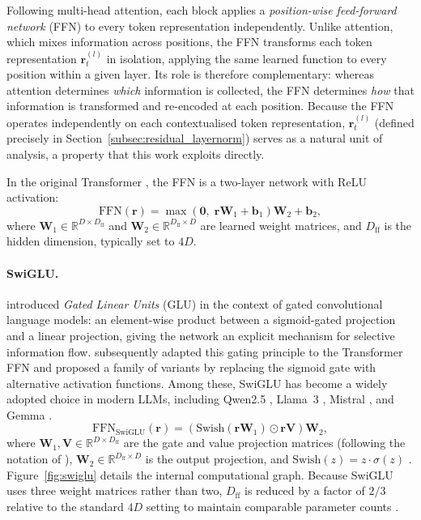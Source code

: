 Following multi-head attention, each block applies a \emph{position-wise
feed-forward network} (FFN) to every token representation independently. Unlike
attention, which mixes information across positions, the FFN transforms each token
representation $\mathbf{r}_t^{(l)}$ in isolation, applying the same learned function
to every position within a given layer. Its role is therefore complementary:
whereas attention determines \emph{which} information is collected, the FFN
determines \emph{how} that information is transformed and re-encoded at each
position. Because the FFN operates independently on each contextualised token
representation, $\mathbf{r}_t^{(l)}$ (defined precisely in
Section~\ref{subsec:residual_layernorm}) serves as a natural unit of analysis, a
property that this work exploits directly.

In the original Transformer \citep{vaswani2017attention}, the FFN is a two-layer
network with ReLU activation:
\begin{equation}
    \mathrm{FFN}(\mathbf{r})
    =
    \max\!\left(\mathbf{0},\; \mathbf{r}\mathbf{W}_1 + \mathbf{b}_1\right)
    \mathbf{W}_2 + \mathbf{b}_2,
    \label{eq:ffn_original}
\end{equation}
where $\mathbf{W}_1 \in \mathbb{R}^{D \times D_{\mathrm{ff}}}$ and
$\mathbf{W}_2 \in \mathbb{R}^{D_{\mathrm{ff}} \times D}$ are learned weight
matrices, and $D_{\mathrm{ff}}$ is the hidden dimension, typically set to $4D$.

\paragraph{SwiGLU.}
\citet{dauphin2017language} introduced \emph{Gated Linear Units} (GLU) in the
context of gated convolutional language models: an element-wise product between a
sigmoid-gated projection and a linear projection, giving the network an explicit
mechanism for selective information flow. \citet{shazeer2020glu} subsequently
adapted this gating principle to the Transformer FFN and proposed a family of
variants by replacing the sigmoid gate with alternative activation functions. Among these, SwiGLU has become a widely adopted choice in modern LLMs, including Qwen2.5 \citep{qwen2025qwen25}, Llama~3 \citep{grattafiori2024llama3}, Mistral \citep{jiang2023mistral}, and Gemma \citep{gemmateam2024gemma}.
\begin{equation}
    \mathrm{FFN}_{\mathrm{SwiGLU}}(\mathbf{r})
    =
    \left(
        \mathrm{Swish}\!\left(\mathbf{r}\mathbf{W}_1\right)
        \odot
        \mathbf{r}\mathbf{V}
    \right)\mathbf{W}_2,
    \label{eq:swiglu}
\end{equation}
where $\mathbf{W}_1, \mathbf{V} \in \mathbb{R}^{D \times D_{\mathrm{ff}}}$ are the
gate and value projection matrices (following the notation of \citet{shazeer2020glu}),
$\mathbf{W}_2 \in \mathbb{R}^{D_{\mathrm{ff}} \times D}$ is the output projection,
and $\mathrm{Swish}(z) = z \cdot \sigma(z)$ \citep{ramachandran2017searching}.
Figure~\ref{fig:swiglu} details the internal computational graph.
Because SwiGLU uses three weight matrices rather than two, $D_{\mathrm{ff}}$ is
reduced by a factor of $2/3$ relative to the standard $4D$ setting to maintain
comparable parameter counts \citep{shazeer2020glu}.

